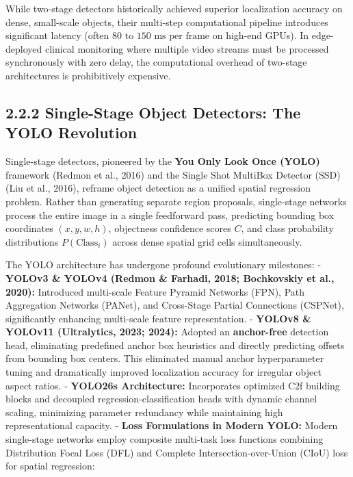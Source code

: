 While two-stage detectors historically achieved superior localization
accuracy on dense, small-scale objects, their multi-step computational
pipeline introduces significant latency (often
\(80\text{ to }150\text{ ms per frame}\) on high-end GPUs). In
edge-deployed clinical monitoring where multiple video streams must be
processed synchronously with zero delay, the computational overhead of
two-stage architectures is prohibitively expensive.

\subsection{2.2.2 Single-Stage Object Detectors: The YOLO
Revolution}\label{single-stage-object-detectors-the-yolo-revolution}

Single-stage detectors, pioneered by the \textbf{You Only Look Once
(YOLO)} framework (Redmon et al., 2016) and the Single Shot MultiBox
Detector (SSD) (Liu et al., 2016), reframe object detection as a unified
spatial regression problem. Rather than generating separate region
proposals, single-stage networks process the entire image in a single
feedforward pass, predicting bounding box coordinates \((x, y, w, h)\),
objectness confidence scores \(C\), and class probability distributions
\(P(\text{Class}_i)\) across dense spatial grid cells simultaneously.

The YOLO architecture has undergone profound evolutionary milestones: -
\textbf{YOLOv3 \& YOLOv4 (Redmon \& Farhadi, 2018; Bochkovskiy et al.,
2020):} Introduced multi-scale Feature Pyramid Networks (FPN), Path
Aggregation Networks (PANet), and Cross-Stage Partial Connections
(CSPNet), significantly enhancing multi-scale feature representation. -
\textbf{YOLOv8 \& YOLOv11 (Ultralytics, 2023; 2024):} Adopted an
\textbf{anchor-free} detection head, eliminating predefined anchor box
heuristics and directly predicting offsets from bounding box centers.
This eliminated manual anchor hyperparameter tuning and dramatically
improved localization accuracy for irregular object aspect ratios. -
\textbf{YOLO26s Architecture:} Incorporates optimized C2f building
blocks and decoupled regression-classification heads with dynamic
channel scaling, minimizing parameter redundancy while maintaining high
representational capacity. - \textbf{Loss Formulations in Modern YOLO:}
Modern single-stage networks employ composite multi-task loss functions
combining Distribution Focal Loss (DFL) and Complete
Intersection-over-Union (CIoU) loss for spatial regression:

